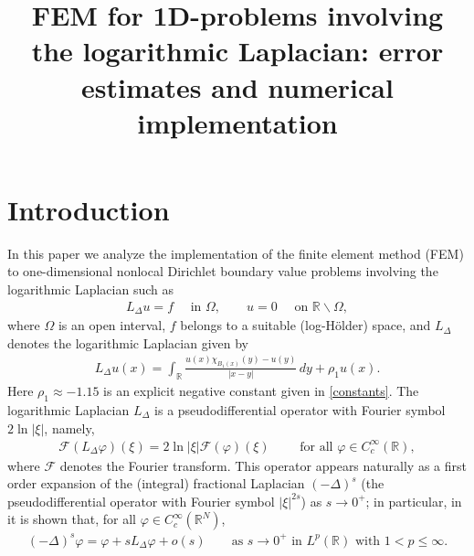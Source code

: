 \documentclass[11 pt]{article}
\title{FEM for 1D-problems involving the logarithmic Laplacian: error estimates and numerical implementation}
\numberwithin{equation}{section}
\def\R{\mathbb{R}}
\begin{document}
\maketitle

\section{Introduction}

In this paper we analyze the implementation of the finite element method (FEM) to one-dimensional nonlocal Dirichlet boundary value problems involving the logarithmic Laplacian such as
\begin{align}\label{P:intro}
    L_\Delta u = f \quad \text{ in }\Omega,\qquad u=0\quad \text{ on }\R\backslash \Omega,
\end{align}
where $\Omega$ is an open interval, $f$ belongs to a suitable (log-Hölder) space, and $L_\Delta$ denotes the logarithmic Laplacian given by
\begin{align}\label{LL}
     L_\Delta u(x)=\int_{\R}\frac{u(x)\chi_{B_1(x)}(y)-u(y)}{|x-y|}\, dy+\rho_1 u(x).
 \end{align}
 Here $\rho_1\approx-1.15$ is an explicit negative constant given in \eqref{constants}. The logarithmic Laplacian $L_\Delta$ is a pseudodifferential operator with Fourier symbol $2\ln|\xi|$, namely,
\begin{align*}
{\mathcal F}(L_\Delta \varphi)(\xi)=2\ln|\xi| {\mathcal F}(\varphi)(\xi)\qquad \text{ for all }\varphi\in C^\infty_c(\R),
\end{align*}
where ${\mathcal F}$ denotes the Fourier transform.  This operator appears naturally as a first order expansion of the (integral) fractional Laplacian $(-\Delta)^s$ (the pseudodifferential operator with Fourier symbol $|\xi|^{2s}$) as $s\to 0^+$; in particular, in \cite[Theorem 1.1]{CW19} it is shown that, for all $\varphi\in C^\infty_c(\R^N)$,
\begin{align*}
(-\Delta)^s\varphi = \varphi + sL_\Delta \varphi + o(s)\qquad \text{as $s\to 0^+$ in }L^p(\R) \text{ with }1<p\leq \infty.
\end{align*}
\end{document}

